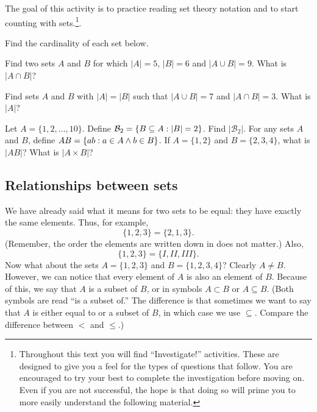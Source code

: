 \documentclass[12pt]{article}
\begin{document}
\begin{activity}
The goal of this activity is to practice reading set theory notation and to start counting with sets.\footnote{Throughout this text you will find ``Investigate!'' activities.  These are designed to give you a feel for the types of questions that follow.  You are encouraged to try your best to complete the investigation before moving on.  Even if you are not successful, the hope is that doing so will prime you to more easily understand the following material.}.
\begin{questions}
\question Find the cardinality of each set below.

\question Find two sets $A$ and $B$ for which $|A| = 5$, $|B| = 6$ and $|A\cup B| = 9$.  What is $|A \cap B|$? 

\question Find sets $A$ and $B$ with $|A| = |B|$ such that $|A\cup B| = 7$ and $|A \cap B| = 3$.  What is $|A|$?

\question Let $A = \{1,2,\ldots, 10\}$.  Define $\mathcal{B}_2 = \{B \subseteq A : |B| = 2\}$.  Find $|\mathcal{B}_2|$.
\question For any sets $A$ and $B$, define $AB = \{ab : a\in A \wedge b \in B\}$.  If $A = \{1,2\}$ and $B = \{2,3,4\}$, what is $|AB|$?  What is $|A \times B|$?
\end{questions}
\end{activity}



\subsection{Relationships between sets}

We have already said what it means for two sets to be equal: they have exactly the same elements.  Thus, for example,
\[ \{1, 2, 3\} = \{2, 1, 3\}.\]
(Remember, the order the elements are written down in does not matter.)  Also,
\[ \{1, 2, 3\} = \{I, II, III\}.\]
Now what about the sets $A = \{1, 2, 3\}$ and $B = \{1, 2, 3, 4\}$?  Clearly $A \ne B$.  However, we can notice that every element of $A$ is also an element of $B$.  Because of this, we say that $A$ is a subset of $B$, or in symbols $A \subset B$ or $A \subseteq B$.  (Both symbols are read ``is a subset of.'' The difference is that sometimes we want to say that $A$ is either equal to or a subset of $B$, in which case we use $\subseteq$.  Compare the difference between $<$ and $\le$.)
\end{document}
